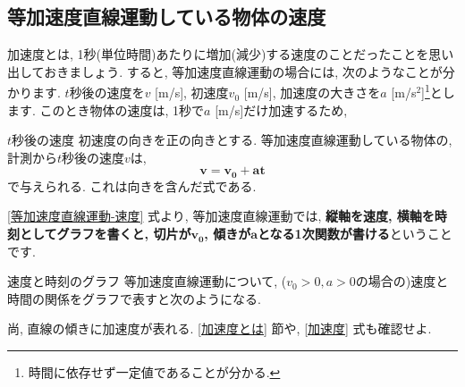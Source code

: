 \documentclass[11pt,dvipdfmx]{jsarticle}
\numberwithin{equation}{section} %
\begin{document}
\subsection{等加速度直線運動している物体の速度}\label{等加速度直線運動している物体の速度}
加速度とは, 1秒(単位時間)あたりに増加(減少)する速度のことだったことを思い出しておきましょう. すると, 等加速度直線運動の場合には, 次のようなことが分かります. $t$秒後の速度を$v$ [m/s], 初速度$v_{0}$ [m/s], 加速度の大きさを$a$ [m/s$^2$]\footnote{時間に依存せず一定値であることが分かる.}とします. このとき物体の速度は, 1秒で$a$ [m/s]だけ加速するため, 
\begin{freebox}{$t$秒後の速度}
    初速度の向きを正の向きとする. 等加速度直線運動している物体の, 計測から$t$秒後の速度$v$は, 
    \begin{equation}
        \bm{v} = \bm{v_{0}} + \bm{at} \label{等加速度直線運動-速度}
    \end{equation}
    で与えられる. これは向きを含んだ式である.
\end{freebox}
\eqref{等加速度直線運動-速度} 式より, 等加速度直線運動では, \textbf{縦軸を速度, 横軸を時刻としてグラフを書くと, 切片が$\bm{v_{0}}$, 傾きが$\bm{a}$となる1次関数が書ける}ということです. 
\begin{freebox}{速度と時刻のグラフ}
    等加速度直線運動について, ($v_{0}>0,  a > 0$の場合の)速度と時間の関係をグラフで表すと次のようになる. 
    \begin{center}
        \end{center}
        尚, 直線の傾きに加速度が表れる. \ref{加速度とは} 節や, \eqref{加速度} 式も確認せよ.
\end{freebox}
\end{document}
